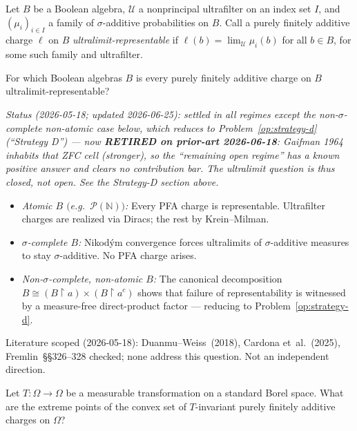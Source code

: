 \begin{openproblem}
\label{op:ultralimit}
Let $B$ be a Boolean algebra, $\mathcal{U}$ a nonprincipal
ultrafilter on an index set $I$, and $(\mu_i)_{i\in I}$ a family of
$\sigma$-additive probabilities on $B$.  Call a purely finitely
additive charge $\ell$ on $B$ \emph{ultralimit-representable} if
$\ell(b) = \lim_{\mathcal{U}}\mu_i(b)$ for all $b\in B$, for some
such family and ultrafilter.

For which Boolean algebras $B$ is every purely finitely additive
charge on $B$ ultralimit-representable?
\end{openproblem}

\emph{Status (2026-05-18; updated 2026-06-25): settled in all regimes
  except the non-$\sigma$-complete non-atomic case below, which reduces
  to Problem~\ref{op:strategy-d} (``Strategy D'') --- now \textbf{RETIRED
  on prior-art 2026-06-18}: Gaifman 1964 inhabits that ZFC cell
  (stronger), so the ``remaining open regime'' has a known positive
  answer and clears no contribution bar. The ultralimit question is
  thus closed, not open. See the Strategy-D section above.}

\begin{itemize}
  \item \emph{Atomic $B$ $($e.g.\ $\mathcal{P}(\mathbb{N}))$:}
    Every PFA charge is representable.  Ultrafilter charges are
    realized via Diracs; the rest by Krein--Milman.
  \item \emph{$\sigma$-complete $B$:} Nikod\'{y}m convergence
    forces ultralimits of $\sigma$-additive measures to stay
    $\sigma$-additive.  No PFA charge arises.
  \item \emph{Non-$\sigma$-complete, non-atomic $B$:} The
    canonical decomposition $B\cong (B{\upharpoonright}a)\times
    (B{\upharpoonright}a^c)$ shows that failure of representability
    is witnessed by a measure-free direct-product factor ---
    reducing to Problem~\ref{op:strategy-d}.
\end{itemize}

\noindent
Literature scoped (2026-05-18): Duanmu--Weiss~(2018),
Cardona et~al.~(2025), Fremlin~\S\S326--328 checked; none
address this question.  Not an independent direction.


\begin{openproblem}
\label{op:ergodic-pfa}
Let $T\colon\Omega\to\Omega$ be a measurable transformation on a
standard Borel space.  What are the extreme points of the convex set
of $T$-invariant purely finitely additive charges on $\Omega$?
\end{openproblem}

